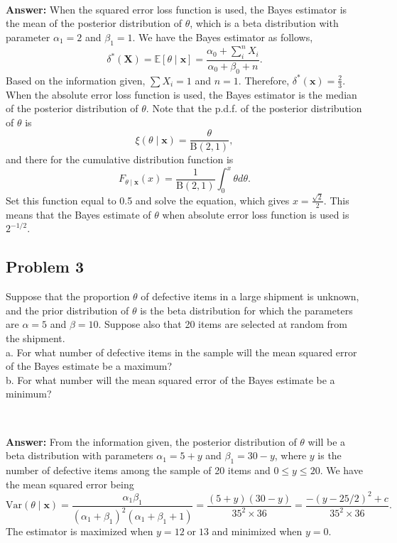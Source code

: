 \documentclass{article}
\begin{document}
\

\textbf{Answer:} When the squared error loss function is used, the Bayes estimator is the mean of the posterior distribution of $\theta$, which is a beta distribution with parameter $\alpha_1 = 2$ and $\beta_1 = 1$. We have the Bayes estimator as follows,
\begin{equation*}
\delta^*(\boldsymbol{X}) = \mathbb{E}[\theta \mid \boldsymbol{x}] = \frac{\alpha_0 + \sum_i^n X_i}{\alpha_0 + \beta_0 + n}.
\end{equation*}
Based on the information given, $\sum X_i = 1$ and $n = 1$. Therefore, $\delta^*(\boldsymbol{x}) = \frac{2}{3}$.\\
When the absolute error loss function is used, the Bayes estimator is the median of the posterior distribution of $\theta$. Note that the p.d.f. of the posterior distribution of $\theta$ is
\begin{equation*}
\xi(\theta \mid \boldsymbol{x}) = \frac{\theta}{\text{B}(2,1)},
\end{equation*}
and there for the cumulative distribution function is
\begin{equation*}
F_{\theta \mid \boldsymbol{x}}(x) = \frac{1}{\text{B}(2,1)} \int_0^x \theta d\theta.
\end{equation*}
Set this function equal to 0.5 and solve the equation, which gives $x = \frac{\sqrt{2}}{2}$. This means that the Bayes estimate of $\theta$ when absolute error loss function is used is $2^{-1/2}$.

\bigskip

\subsection*{Problem 3}
Suppose that the proportion $\theta$ of defective items in a large shipment is unknown, and the prior distribution of $\theta$ is the beta distribution for which the parameters are $\alpha = 5$ and $\beta = 10$. Suppose also that 20 items are selected at random from the shipment.\\
a. For what number of defective items in the sample will the mean squared error of the Bayes estimate be a maximum?\\
b. For what number will the mean squared error of the Bayes estimate be a minimum?

\

\textbf{Answer:} From the information given, the posterior distribution of $\theta$ will be a beta distribution with parameters $\alpha_1 = 5 + y$ and $\beta_1 = 30 - y$, where $y$ is the number of defective items among the sample of 20 items and $0 \le y \le 20$. We have the mean squared error being
\begin{equation*}
\text{Var}(\theta \mid \boldsymbol{x}) = \frac{\alpha_1 \beta_1}{(\alpha_1 + \beta_1)^2 (\alpha_1 + \beta_1 + 1)} = \frac{(5 + y)(30-y)}{35^2 \times 36} = \frac{- (y - 25/2)^2 + c}{35^2 \times 36}.
\end{equation*}
The estimator is maximized when $y = 12 \; \text{or} \; 13$ and minimized when $y = 0$.
\end{document}
